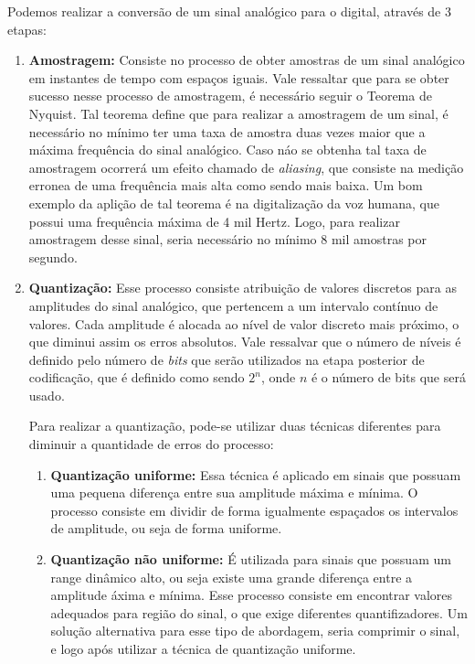 \documentclass[a4paper,12pt,twoside,openright]{report}
\begin{document}
\par Podemos realizar a convers\~{a}o de um sinal anal\'{o}gico para o digital, atrav\'{e}s de 3 etapas:
\begin{enumerate}
	\item{} \textbf{Amostragem:} Consiste no processo de obter amostras de um sinal anal\'{o}gico em instantes de tempo com espa{\c c}os iguais. Vale ressaltar que para se obter sucesso nesse processo de amostragem, \'{e} necess\'{a}rio seguir o Teorema de Nyquist. Tal teorema define que para realizar a amostragem de um sinal, \'{e} necess\'{a}rio no m\'{i}nimo ter uma taxa de amostra duas vezes maior que a m\'{a}xima frequ\^{e}ncia do sinal anal\'{o}gico. Caso n\'{a}o se obtenha tal taxa de amostragem ocorrer\'{a} um efeito chamado de \textit{aliasing}, que consiste na medi{\c c}\~{a}o erronea de uma frequ\^{e}ncia mais alta como sendo mais baixa. Um bom exemplo da apli{\c c}\~{a}o de tal teorema \'{e} na digitaliza{\c c}\~{a}o da voz humana, que possui uma frequ\^{e}ncia m\'{a}xima de 4 mil Hertz. Logo, para realizar amostragem desse sinal, seria necess\'{a}rio no m\'{i}nimo 8 mil amostras por segundo.
	\item{} \textbf{Quantiza{\c c}\~{a}o:} Esse processo consiste atribui{\c c}\~{a}o de valores discretos para as amplitudes do sinal anal\'{o}gico, que pertencem a um intervalo cont\'{i}nuo de valores. Cada amplitude \'{e} alocada ao n\'{i}vel de valor discreto mais pr\'{o}ximo, o que diminui assim os erros absolutos. Vale ressalvar que o n\'{u}mero de n\'{i}veis \'{e} definido pelo n\'{u}mero de \textit{bits} que ser\~{a}o utilizados na etapa posterior de codifica{\c c}\~{a}o, que \'{e} definido como sendo ${2^n}$, onde ${n}$ \'{e} o n\'{u}mero de bits que ser\'{a} usado.
	\par Para realizar a quantiza{\c c}\~{a}o, pode-se utilizar duas t\'{e}cnicas diferentes para diminuir a quantidade de erros do processo:
	\begin{enumerate}
		\item {} \textbf{Quantiza{\c c}\~{a}o uniforme:} Essa t\'{e}cnica \'{e} aplicado em sinais que possuam uma pequena diferen{\c c}a entre sua amplitude m\'{a}xima e m\'{i}nima. O processo consiste em dividir de forma igualmente espa{\c c}ados os intervalos de amplitude, ou seja de forma uniforme.
		\item {} \textbf{Quantiza{\c c}\~{a}o n\~{a}o uniforme:} \'{E} utilizada para sinais que possuam um range din\^{a}mico alto, ou seja existe uma grande diferen{\c c}a entre a amplitude \'{a}xima e m\'{i}nima. Esse processo consiste em encontrar valores adequados para regi\~{a}o do sinal, o que exige diferentes quantifizadores. Um solu{\c c}\~{a}o alternativa para esse tipo de abordagem, seria comprimir o sinal, e logo ap\'{o}s utilizar a t\'{e}cnica de quantiza{\c c}\~{a}o uniforme.
	\end{enumerate}
	

\end{enumerate}
\end{document}
